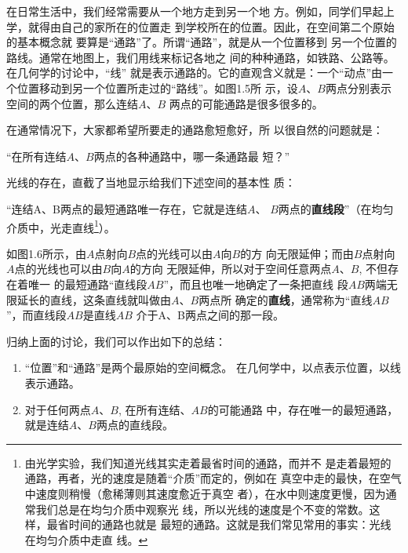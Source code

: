 在日常生活中，我们经常需要从一个地方走到另一个地
方。例如，同学们早起上学，就得由自己的家所在的位置走
到学校所在的位置。因此，在空间第二个原始的基本概念就
要算是“通路”了。所谓“通路”，就是从一个位置移到
另一个位置的路线。通常在地图上，我们用线来标记各地之
间的种种通路，如铁路、公路等。在几何学的讨论中，“线”
就是表示通路的。它的直观含义就是：一个“动点”由一
个位置移动到另一个位置所走过的“路线”。如图1.5所
示，设$A$、$B$两点分别表示空间的两个位置，那么连结$A$、$B$
两点的可能通路是很多很多的。

在通常情况下，大家都希望所要走的通路愈短愈好，所
以很自然的问题就是：

“在所有连结$A$、$B$两点的各种通路中，哪一条通路最
短？”

光线的存在，直截了当地显示给我们下述空间的基本性
质：

“连结A、B两点的最短通路唯一存在，它就是连结$A$、
$B$两点的\textbf{直线段}”（在均匀介质中，光走直线\footnote{由光学实验，我们知道光线其实走着最省时间的通路，而并不
	是走着最短的通路，再者，光的速度是随着“介质”而定的，例如在
	真空中走的最快，在空气中速度则稍慢（愈稀薄则其速度愈近于真空
	者），在水中则速度更慢，因为通常我们总是在均匀介质中观察光
	线，所以光线的速度是个不变的常数。这样，最省时间的通路也就是
	最短的通路。这就是我们常见常用的事实：光线在均匀介质中走直
	线。}）。

\begin{figure}[htp]
	\centering
{}
	\caption{}
\end{figure}


如图1.6所示，由$A$点射向$B$点的光线可以由$A$向$B$的方
向无限延伸；而由$B$点射向$A$点的光线也可以由$B$向$A$的方向
无限延伸，所以对于空间任意两点$A$、$B$, 不但存在着唯一
的最短通路“直线段$AB$”，而且也唯一地确定了一条把直线
段$AB$两端无限延长的直线，这条直线就叫做由$A$、$B$两点所
确定的\textbf{直线}，通常称为“直线$AB$”，而直线段$AB$是直线$AB$
介于A、B两点之间的那一段。

归纳上面的讨论，我们可以作出如下的总结：

\begin{enumerate}
	\item “位置”和“通路”是两个最原始的空间概念。
在几何学中，以点表示位置，以线表示通路。
\item 对于任何两点$A$、$B$, 在所有连结、$AB$的可能通路
中，存在唯一的最短通路，就是连结$A$、$B$两点的直线段。
\end{enumerate}

